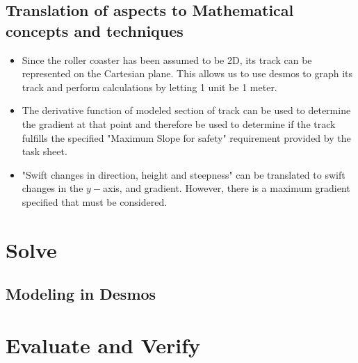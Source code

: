 \documentclass[11pt, letterpaper]{article}
\begin{document}
\subsection{Translation of aspects to Mathematical concepts and techniques}
\begin{itemize}
	\item Since the roller coaster has been assumed to be 2D, its track can be represented on the Cartesian plane. This allows us to use desmos to graph its track and perform calculations by letting 1 unit be 1 meter. 
	\item The derivative function of modeled section of track can be used to determine the gradient at that point and therefore be used to determine if the track fulfills the specified "Maximum Slope for safety" requirement provided by the task sheet.
	\item "Swift changes in direction, height and steepness" can be translated to swift changes in the $y-$axis, and gradient. However, there is a maximum gradient specified that must be considered. 
\end{itemize}


\section{Solve}
\subsection{Modeling in Desmos}




\section{Evaluate and Verify}
\end{document}
